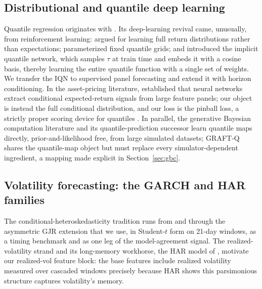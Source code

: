 \documentclass[11pt]{article}
\begin{document}
\subsection{Distributional and quantile deep learning}
Quantile regression originates with \citet{koenker1978}. Its deep-learning revival came, unusually, from reinforcement learning: \citet{bellemare2017c51} argued for learning full return distributions rather than expectations; \citet{dabney2018qrdqn} parameterized fixed quantile grids; and \citet{dabney2018iqn} introduced the implicit quantile network, which samples $\tau$ at train time and embeds it with a cosine basis, thereby learning the entire quantile function with a single set of weights. We transfer the IQN to supervised panel forecasting and extend it with horizon conditioning. In the asset-pricing literature, \citet{gukellyxiu2020} established that neural networks extract conditional expected-return signals from large feature panels; our object is instead the full conditional distribution, and our loss is the pinball loss, a strictly proper scoring device for quantiles \citep{gneitingraftery2007}. In parallel, the generative Bayesian computation literature \citep{polson2023gbc} and its quantile-prediction successor \citep{nareklishvili2025gqbp} learn quantile maps directly, prior-and-likelihood free, from large simulated datasets; GRAFT-Q shares the quantile-map object but must replace every simulator-dependent ingredient, a mapping made explicit in Section~\ref{sec:gbc}.

\subsection{Volatility forecasting: the GARCH and HAR families}
The conditional-heteroskedasticity tradition runs from \citet{engle1982} and \citet{bollerslev1986} through the asymmetric GJR extension \citep{glosten1993} that we use, in Student-$t$ form on 21-day windows, as a timing benchmark and as one leg of the model-agreement signal. The realized-volatility strand \citep{andersen2003} and its long-memory workhorse, the HAR model of \citet{corsi2009}, motivate our realized-vol feature block: the base features include realized volatility measured over cascaded windows precisely because HAR shows this parsimonious structure captures volatility's memory.
\end{document}
